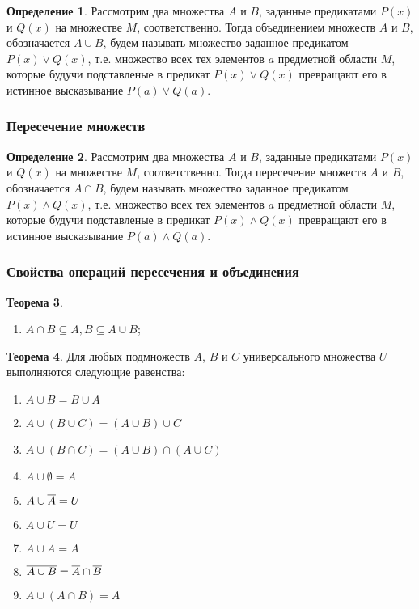\documentclass[letterpaper, 10pt]{article}
\theoremstyle{definition}
\newtheorem{thm}{Теорема}[section]
\newtheorem{define}[thm]{Определение}
\begin{document}
	\begin{define}
		Рассмотрим два множества $A$ и $B$, заданные предикатами
		$P(x)$ и $Q(x)$ на множестве $M$, соответственно. Тогда объединением
		множеств $A$ и $B$, обозначается $A \cup B$, будем называть множество
		заданное предикатом $P(x) \lor Q(x)$, т.е. множество всех тех элементов
		$a$ предметной области $M$, которые будучи подставленые в предикат $P(x)
		\lor Q(x)$ превращают его в истинное высказывание $P(a) \lor Q(a)$.
	\end{define}

	\subsubsection{Пересечение множеств}

	\begin{define}
		Рассмотрим два множества $A$ и $B$, заданные предикатами $P(x)$ и $Q(x)$
		на множестве $M$, соответственно. Тогда пересечение множеств $A$ и $B$,
		обозначается $A \cap B$, будем называть множество заданное предикатом
		$P(x) \land Q(x)$, т.е. множество всех тех элементов $a$ предметной
		области $M$, которые будучи подставленые в предикат $P(x) \land Q(x)$
		превращают его в истинное высказывание $P(a) \land Q(a)$.
	\end{define}

	\subsubsection{Свойства операций пересечения и объединения}
	\begin{thm}
		\begin{enumerate}
			\item $A \cap B \subseteq A,B \subseteq A \cup B$;
		\end{enumerate}
	\end{thm}

	\begin{thm}
		Для любых подмножеств $A$, $B$ и $C$ универсального множества $U$
		выполняются следующие равенства:
		\begin{enumerate}
			\item $A \cup B = B \cup A$
			\item $A \cup (B \cup C) = (A \cup B) \cup C$
			\item $A \cup (B \cap C) = (A \cup B) \cap (A \cup C)$
			\item $A \cup \emptyset = A$
			\item $A \cup \overline{A} = U$
			\item $A \cup U = U$
			\item $A \cup A = A$
			\item $\overline{A \cup B} = \overline{A} \cap
				\overline{B}$
			\item $A \cup (A \cap B) = A$
		\end{enumerate}
	\end{thm}
\end{document}
